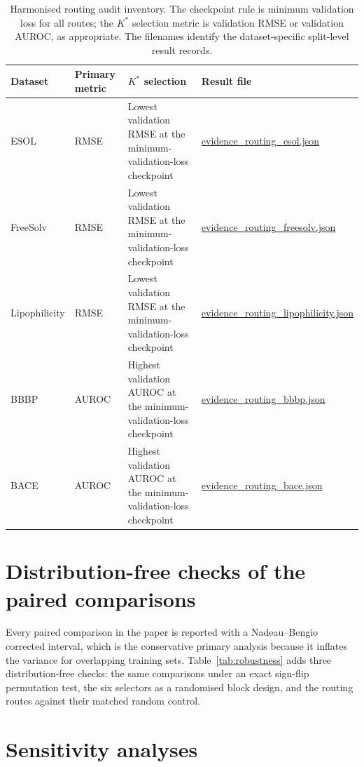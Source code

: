 \documentclass[10pt,a4paper]{article}
\renewcommand{\thetable}{S\arabic{table}}
\begin{document}
\begin{table}[H]
\renewcommand{\thetable}{S18}
\caption{Harmonised routing audit inventory. The checkpoint rule is minimum validation loss for all routes; the $K^*$ selection metric is validation RMSE or validation AUROC, as appropriate. The filenames identify the dataset-specific split-level result records.}\label{tab:routing-audit}
\centering\scriptsize
\setlength{\tabcolsep}{4pt}
\begin{tabular}{@{}llp{}p{}@{}}
\toprule
Dataset & Primary metric & $K^*$ selection & Result file \\
\midrule
ESOL & RMSE & Lowest validation RMSE at the minimum-validation-loss checkpoint & \url{evidence_routing_esol.json} \\
FreeSolv & RMSE & Lowest validation RMSE at the minimum-validation-loss checkpoint & \url{evidence_routing_freesolv.json} \\
Lipophilicity & RMSE & Lowest validation RMSE at the minimum-validation-loss checkpoint & \url{evidence_routing_lipophilicity.json} \\
BBBP & AUROC & Highest validation AUROC at the minimum-validation-loss checkpoint & \url{evidence_routing_bbbp.json} \\
BACE & AUROC & Highest validation AUROC at the minimum-validation-loss checkpoint & \url{evidence_routing_bace.json} \\
\bottomrule
\end{tabular}
\end{table}

\section*{Distribution-free checks of the paired comparisons}

Every paired comparison in the paper is reported with a Nadeau--Bengio corrected interval, which is the conservative primary analysis because it inflates the variance for overlapping training sets. Table~\ref{tab:robustness} adds three distribution-free checks: the same comparisons under an exact sign-flip permutation test, the six selectors as a randomised block design, and the routing routes against their matched random control.



\section*{Sensitivity analyses}
\end{document}
